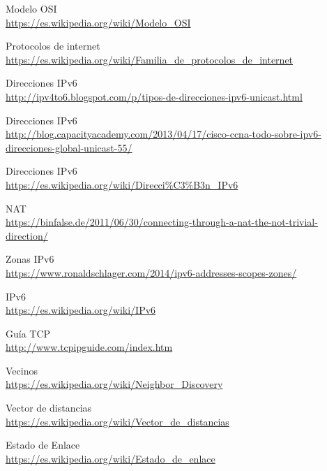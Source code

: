 \begin{thebibliography}{9}
\bibitem{} 
Modelo OSI
\\\url{https://es.wikipedia.org/wiki/Modelo\_OSI}

\bibitem{} 
Protocolos de internet
\\\url{https://es.wikipedia.org/wiki/Familia\_de\_protocolos\_de\_internet}

\bibitem{} 
Direcciones IPv6
\\\url{http://ipv4to6.blogspot.com/p/tipos-de-direcciones-ipv6-unicast.html}

\bibitem{} 
Direcciones IPv6
\\\url{http://blog.capacityacademy.com/2013/04/17/cisco-ccna-todo-sobre-ipv6-direcciones-global-unicast-55/}

\bibitem{} 
Direcciones IPv6
\\\url{https://es.wikipedia.org/wiki/Direcci\%C3\%B3n\_IPv6}

\bibitem{} 
NAT
\\\url{https://binfalse.de/2011/06/30/connecting-through-a-nat-the-not-trivial-direction/}

\bibitem{} 
Zonas IPv6
\\\url{https://www.ronaldschlager.com/2014/ipv6-addresses-scopes-zones/}

\bibitem{} 
IPv6
\\\url{https://es.wikipedia.org/wiki/IPv6}

\bibitem{} 
Guía TCP
\\\url{http://www.tcpipguide.com/index.htm}

\bibitem{} 
Vecinos
\\\url{https://es.wikipedia.org/wiki/Neighbor\_Discovery}

\bibitem{} 
Vector de distancias
\\\url{https://es.wikipedia.org/wiki/Vector\_de\_distancias}

\bibitem{} 
Estado de Enlace
\\\url{https://es.wikipedia.org/wiki/Estado\_de\_enlace}


\end{thebibliography}
